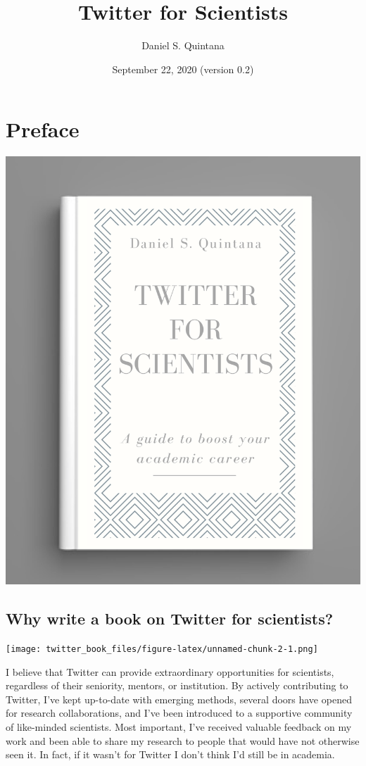 \documentclass[
]{book}
\title{Twitter for Scientists}
\author{Daniel S. Quintana}
\date{September 22, 2020 (version 0.2)}
\begin{document}
\maketitle

{
\setcounter{tocdepth}{1}
\tableofcontents
}
\hypertarget{preface}{%
\chapter*{Preface}\label{preface}}

\begin{flushleft}\includegraphics[width=0.8\linewidth,height=0.5\textheight]{images/book_cover} \end{flushleft}

\hypertarget{why-write-a-book-on-twitter-for-scientists}{%
\section*{Why write a book on Twitter for scientists?}\label{why-write-a-book-on-twitter-for-scientists}}

\texttt{[image: twitter\_book\_files/figure-latex/unnamed-chunk-2-1.png]}

I believe that Twitter can provide extraordinary opportunities for scientists, regardless of their seniority, mentors, or institution. By actively contributing to Twitter, I've kept up-to-date with emerging methods, several doors have opened for research collaborations, and I've been introduced to a supportive community of like-minded scientists. Most important, I've received valuable feedback on my work and been able to share my research to people that would have not otherwise seen it. In fact, if it wasn't for Twitter I don't think I'd still be in academia.
\end{document}
